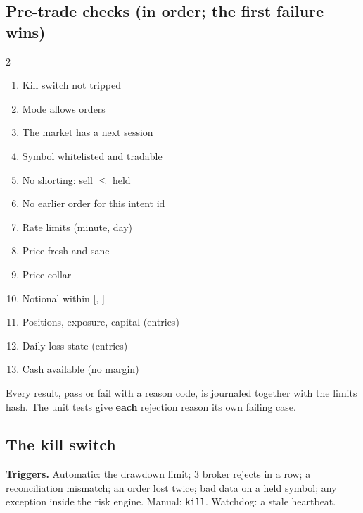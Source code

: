 \documentclass[11pt,a4paper]{article}
\newcommand\euro{\ifmmode\text{\texteuro}\else\texteuro\fi}
\newcommand\code[1]{\texttt{#1}}
\begin{document}
\subsection{Pre-trade checks (in order; the first failure wins)}
\begin{multicols}{2}\small
\begin{enumerate}
  \item Kill switch not tripped
  \item Mode allows orders
  \item The market has a next session
  \item Symbol whitelisted and tradable
  \item No shorting: sell $\le$ held
  \item No earlier order for this intent id
  \item Rate limits (minute, day)
  \item Price fresh and sane
  \item Price collar
  \item Notional within [\euro20, \euro250]
  \item Positions, exposure, capital (entries)
  \item Daily loss state (entries)
  \item Cash available (no margin)
\end{enumerate}
\end{multicols}
Every result, pass or fail with a reason code, is journaled together with the limits hash. The unit tests give \textbf{each}
rejection reason its own failing case.

\subsection{The kill switch}
\textbf{Triggers.} Automatic: the drawdown limit; 3 broker rejects in a row; a reconciliation mismatch; an order lost twice;
bad data on a held symbol; any exception inside the risk engine. Manual: \code{kill}. Watchdog: a stale heartbeat.
\end{document}
